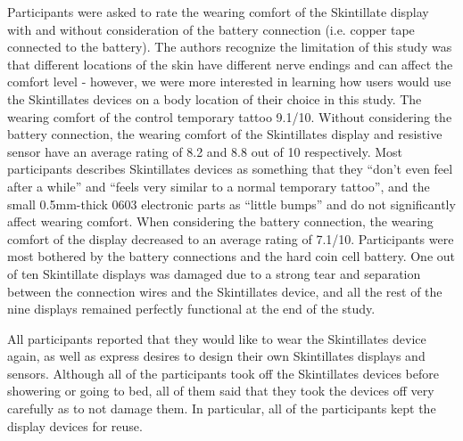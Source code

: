 \documentclass{sigchi}
\begin{document}
Participants were asked to rate the wearing comfort of the Skintillate display with and without consideration of the battery connection (i.e. copper tape connected to the battery). The authors recognize the limitation of this study was that different locations of the skin have different nerve endings and can affect the comfort level - however, we were more interested in learning how users would use the Skintillates devices on a body location of their choice in this study. The wearing comfort of the control temporary tattoo 9.1/10. Without considering the battery connection, the wearing comfort of the Skintillates display and resistive sensor have an average rating of 8.2 and 8.8 out of 10 respectively. Most participants describes Skintillates devices as something that they ``don't even feel after a while'' and ``feels very similar to a normal temporary tattoo'', and the small 0.5mm-thick 0603 electronic parts as ``little bumps'' and do not significantly affect wearing comfort. When considering the battery connection, the wearing comfort of the display decreased to an average rating of 7.1/10. Participants were most bothered by the battery connections and the hard coin cell battery. One out of ten Skintillate displays was damaged due to a strong tear and separation between the connection wires and the Skintillates device, and all the rest of the nine displays remained perfectly functional at the end of the study.

All participants reported that they would like to wear the Skintillates device again, as well as express desires to design their own Skintillates displays and sensors. Although all of the participants took off the Skintillates devices before showering or going to bed, all of them said that they took the devices off very carefully as to not damage them. In particular, all of the participants kept the display devices for reuse. 
\end{document}
